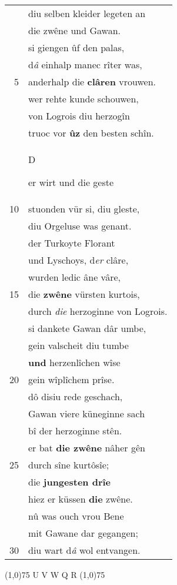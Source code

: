 \documentclass[8pt,a4paper,notitlepage]{article}
\begin{document}
\begin{table}[ht]
\begin{minipage}[t]{0.5\linewidth}
\begin{tabular}{rl}
 & diu selben kleider legeten an\\ 
 & die zwêne und Gawan.\\ 
 & si giengen ûf den palas,\\ 
 & d\textit{â} einhalp manec rîter was,\\ 
5 & anderhalp die \textbf{clâren} vrouwen.\\ 
 & wer rehte kunde schouwen,\\ 
 & von Logrois diu herzogîn\\ 
 & truoc vor \textbf{ûz} den besten schîn.\\ 
 & \begin{large}D\end{large}er wirt und die geste\\ 
10 & stuonden vür si, diu gleste,\\ 
 & diu Orgeluse was genant.\\ 
 & der Turkoyte Florant\\ 
 & und Lyschoys, d\textit{er} clâre,\\ 
 & wurden ledic âne vâre,\\ 
15 & die \textbf{zwêne} vürsten kurtois,\\ 
 & durch \textit{die} herzoginne von Logrois.\\ 
 & si dankete Gawan dâr umbe,\\ 
 & gein valscheit diu tumbe\\ 
 & \textbf{und} herzenlîchen wîse\\ 
20 & gein wîplîchem prîse.\\ 
 & dô disiu rede geschach,\\ 
 & Gawan viere küneginne sach\\ 
 & bî der herzoginne stên.\\ 
 & er bat \textbf{die zwêne} nâher gên\\ 
25 & durch sîne kurtôsîe;\\ 
 & die \textbf{jungesten drîe}\\ 
 & hiez er küssen \textbf{die} zwêne.\\ 
 & nû was ouch vrou Bene\\ 
 & mit Gawane dar gegangen;\\ 
30 & diu wart d\textit{â} wol entvangen.\\ 
\end{tabular}
\scriptsize
\line(1,0){75} \newline
U V W Q R \newline
\line(1,0){75} \newline

\end{minipage}
\end{table}
\end{document}
